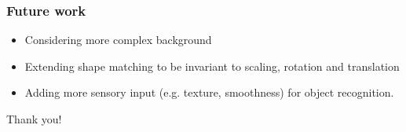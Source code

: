 \documentclass{beamer}
\begin{document}
\begin{frame}
\frametitle{Future work}
\begin{itemize}
\item Considering more complex background
\item Extending shape matching to be invariant to scaling, rotation and translation
\item Adding more sensory input (e.g. texture, smoothness) for object recognition. 
\end{itemize}
\end{frame}

\begin{frame}
\Huge{\centerline{Thank you!}}
\end{frame}

\end{document}
